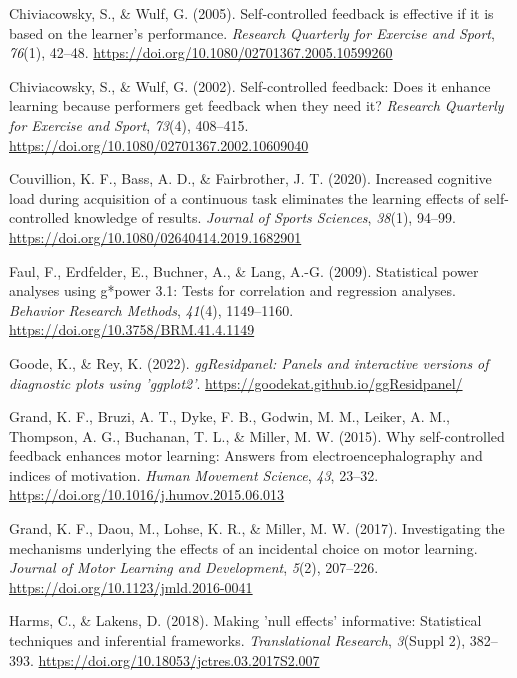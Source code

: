 \documentclass[
  man, donotrepeattitle,floatsintext]{apa7}
\newlength{\cslhangindent}
\newlength{\cslentryspacingunit} %
\newenvironment{CSLReferences}[2] %
 {%
  \setlength{\parindent}{0pt}
  \ifodd #1
  \let\oldpar\par
  \def\par{\hangindent=\cslhangindent\oldpar}
  \fi
  \setlength{\parskip}{#2\cslentryspacingunit}
 }%
 {}
\begin{document}
\begin{CSLReferences}{1}{0}
\leavevmode{}%
Chiviacowsky, S., \& Wulf, G. (2005). Self-controlled feedback is effective if it is based on the learner's performance. \emph{Research Quarterly for Exercise and Sport}, \emph{76}(1), 42--48. \url{https://doi.org/10.1080/02701367.2005.10599260}

\leavevmode{}%
Chiviacowsky, S., \& Wulf, G. (2002). Self-controlled feedback: {Does} it enhance learning because performers get feedback when they need it? \emph{Research Quarterly for Exercise and Sport}, \emph{73}(4), 408--415. \url{https://doi.org/10.1080/02701367.2002.10609040}

\leavevmode{}%
Couvillion, K. F., Bass, A. D., \& Fairbrother, J. T. (2020). Increased cognitive load during acquisition of a continuous task eliminates the learning effects of self-controlled knowledge of results. \emph{Journal of Sports Sciences}, \emph{38}(1), 94--99. \url{https://doi.org/10.1080/02640414.2019.1682901}

\leavevmode{}%
Faul, F., Erdfelder, E., Buchner, A., \& Lang, A.-G. (2009). Statistical power analyses using g*power 3.1: Tests for correlation and regression analyses. \emph{Behavior Research Methods}, \emph{41}(4), 1149--1160. \url{https://doi.org/10.3758/BRM.41.4.1149}

\leavevmode{}%
Goode, K., \& Rey, K. (2022). \emph{ggResidpanel: Panels and interactive versions of diagnostic plots using 'ggplot2'}. \url{https://goodekat.github.io/ggResidpanel/}

\leavevmode{}%
Grand, K. F., Bruzi, A. T., Dyke, F. B., Godwin, M. M., Leiker, A. M., Thompson, A. G., Buchanan, T. L., \& Miller, M. W. (2015). Why self-controlled feedback enhances motor learning: {Answers} from electroencephalography and indices of motivation. \emph{Human Movement Science}, \emph{43}, 23--32. \url{https://doi.org/10.1016/j.humov.2015.06.013}

\leavevmode{}%
Grand, K. F., Daou, M., Lohse, K. R., \& Miller, M. W. (2017). Investigating the mechanisms underlying the effects of an incidental choice on motor learning. \emph{Journal of Motor Learning and Development}, \emph{5}(2), 207--226. \url{https://doi.org/10.1123/jmld.2016-0041}

\leavevmode{}%
Harms, C., \& Lakens, D. (2018). Making 'null effects' informative: Statistical techniques and inferential frameworks. \emph{Translational Research}, \emph{3}(Suppl 2), 382--393. \url{https://doi.org/10.18053/jctres.03.2017S2.007}


\end{CSLReferences}
\end{document}
